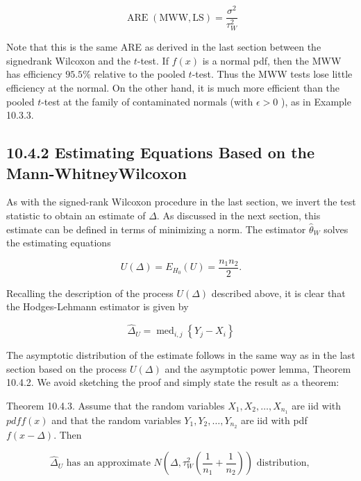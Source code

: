 \begin{equation*}
\operatorname{ARE}(\mathrm{MWW}, \mathrm{LS})=\frac{\sigma^{2}}{\tau_{W}^{2}} \tag{10.4.26}
\end{equation*}


Note that this is the same ARE as derived in the last section between the signedrank Wilcoxon and the $t$-test. If $f(x)$ is a normal pdf, then the MWW has efficiency $95.5 \%$ relative to the pooled $t$-test. Thus the MWW tests lose little efficiency at the normal. On the other hand, it is much more efficient than the pooled $t$-test at the family of contaminated normals (with $\epsilon>0$ ), as in Example 10.3.3.

\subsection*{10.4.2 Estimating Equations Based on the Mann-WhitneyWilcoxon}
As with the signed-rank Wilcoxon procedure in the last section, we invert the test statistic to obtain an estimate of $\Delta$. As discussed in the next section, this estimate can be defined in terms of minimizing a norm. The estimator $\widehat{\theta}_{W}$ solves the estimating equations


\begin{equation*}
U(\Delta)=E_{H_{0}}(U)=\frac{n_{1} n_{2}}{2} . \tag{10.4.27}
\end{equation*}


Recalling the description of the process $U(\Delta)$ described above, it is clear that the Hodges-Lehmann estimator is given by


\begin{equation*}
\widehat{\Delta}_{U}=\operatorname{med}_{i, j}\left\{Y_{j}-X_{i}\right\} \tag{10.4.28}
\end{equation*}


The asymptotic distribution of the estimate follows in the same way as in the last section based on the process $U(\Delta)$ and the asymptotic power lemma, Theorem 10.4.2. We avoid sketching the proof and simply state the result as a theorem:

Theorem 10.4.3. Assume that the random variables $X_{1}, X_{2}, \ldots, X_{n_{1}}$ are iid with $p d f f(x)$ and that the random variables $Y_{1}, Y_{2}, \ldots, Y_{n_{2}}$ are iid with pdf $f(x-\Delta)$. Then


\begin{equation*}
\widehat{\Delta}_{U} \text { has an approximate } N\left(\Delta, \tau_{W}^{2}\left(\frac{1}{n_{1}}+\frac{1}{n_{2}}\right)\right) \text { distribution, } \tag{10.4.29}
\end{equation*}


